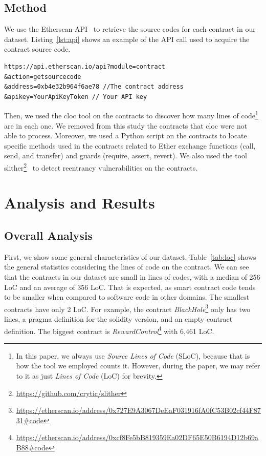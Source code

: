 \documentclass[10pt,conference]{IEEEtran}
\begin{document}
\subsection{Method}

We use the Etherscan API~\cite{etherscan_api} to retrieve the source codes for each contract in our dataset. Listing~\ref{lst:api} shows an example of the API call used to acquire the contract source code.
\begin{lstlisting}[language=solidity, caption=Etherscan API call, label={lst:api}]
https://api.etherscan.io/api?module=contract
&action=getsourcecode
&address=0xb4e32b964f6ae78 //The contract address
&apikey=YourApiKeyToken // Your API key
\end{lstlisting}

Then, we used the cloc tool on the contracts to discover how many lines of code\footnote{In this paper, we always use \textit{Source Lines of Code} (SLoC), because that is how the tool we employed counts it. However, during the paper, we may refer to it as just \textit{Lines of Code} (LoC) for brevity.} are in each one. We removed from this study the contracts that cloc were not able to process. Moreover, we used a Python script on the contracts to locate specific methods used in the contracts related to Ether exchange functions (call, send, and transfer) and guards (require, assert, revert). We also used the tool slither\footnote{\url{https://github.com/crytic/slither}}~\cite{slither} to detect reentrancy vulnerabilities on the contracts.


\section{Analysis and Results}\label{sec:results}



\subsection{Overall Analysis}

First, we show some general characteristics of our dataset.
Table~\ref{tab:loc} shows the general statistics considering the lines of code on the contract. We can see that the contracts in our dataset are small in lines of codes, with a median of 256 LoC and an average of 356 LoC. That is expected, as smart contract code tends to be smaller when compared to software code in other domains.  The smallest contracts have only 2 LoC.  For example, the contract \textit{BlackHole}\footnote{\url{https://etherscan.io/address/0x727E9A3067DeEaF031916fA0fC53B02cf44F8731\#code}} only has two lines, a pragma definition for the solidity version, and an empty contract definition. The biggest contract is \textit{RewardControl}\footnote{\url{https://etherscan.io/address/0xcf8Fe5bB819359Ea02DF65E50B6194D12b69aB88\#code}} with 6,461 LoC. 
\end{document}
